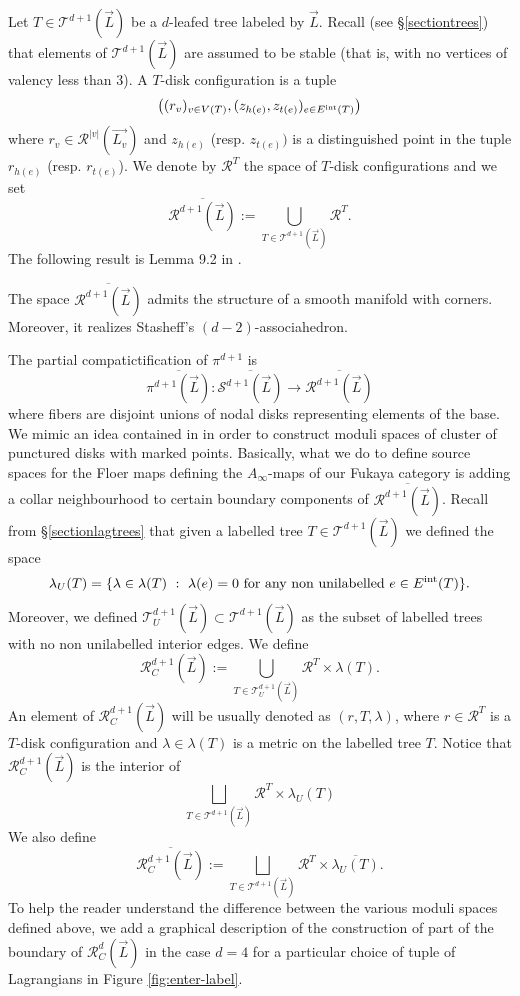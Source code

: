 Let $T\in \mathcal{T}^{d+1}(\vec{L})$ be a $d$-leafed tree labeled by $\vec{L}$. Recall (see \S \ref{sectiontrees}) that elements of $\mathcal{T}^{d+1}(\vec{L})$ are assumed to be stable (that is, with no vertices of valency less than $3$). A $T$-disk configuration is a tuple $$\left((r_v)_{v\in V(T)}, (z_{h(e)},z_{t(e)})_{e\in E^\textnormal{int}(T)}\right)$$ where $r_v\in \mathcal{R}^{|v|}(\vec{L_v})$ and $z_{h(e)}$ (resp. $z_{t(e)})$ is a distinguished point in the tuple $r_{h(e)}$ (resp. $r_{t(e)}$). We denote by $\mathcal{R}^T$ the space of $T$-disk configurations and we set $$\overline{\mathcal{R}^{d+1}(\vec{L})}:=\bigcup_{T\in \mathcal{T}^{d+1}(\vec{L})}\mathcal{R}^T.$$
The following result is Lemma 9.2 in \cite{Se:book-fukaya-categ}.
\begin{lemma}\label{disc2}
	The space $\overline{\mathcal{R}^{d+1}(\vec{L})}$ admits the structure of a smooth manifold with corners. Moreover, it realizes Stasheff's $(d-2)$-associahedron.
\end{lemma}
\noindent The partial compatictification of $\pi^{d+1}$ is  $$\overline{\pi^{d+1}(\vec{L})}: \overline{\mathcal{S}^{d+1}(\vec{L})}\to \overline{\mathcal{R}^{d+1}(\vec{L})}$$ where fibers are disjoint unions of nodal disks representing elements of the base.\\

We mimic an idea contained in \cite{Charest2012SourceComplexes} in order to construct moduli spaces of cluster of punctured disks with marked points. Basically, what we do to define source spaces for the Floer maps defining the $A_\infty$-maps of our Fukaya category is adding a collar neighbourhood to certain boundary components of $\overline{\mathcal{R}^{d+1}(\vec{L})}$. Recall from \S \ref{sectionlagtrees} that given a labelled tree $T\in \mathcal{T}^{d+1}(\vec{L})$ we defined the space $$\lambda_U(T)=\{\lambda\in \lambda(T) \ : \ \lambda(e)= 0 \textnormal{ for any non unilabelled }e\in E^\textnormal{int}(T)\}.$$ Moreover, we defined $\mathcal{T}^{d+1}_U(\vec{L})\subset \mathcal{T}^{d+1}(\vec{L})$ as the subset of labelled trees with no non unilabelled interior edges. We define $$\mathcal{R}^{d+1}_C(\vec{L}):=\bigcup_{T\in \mathcal{T}^{d+1}_U(\vec{L})}\mathcal{R}^T\times \lambda(T).$$ An element of $\mathcal{R}^{d+1}_C(\vec{L})$ will be usually denoted as $(r,T,\lambda)$, where $r\in \mathcal{R}^T$ is a $T$-disk configuration and $\lambda\in \lambda(T)$ is a metric on the labelled tree $T$. Notice that $\mathcal{R}^{d+1}_C(\vec{L})$ is the interior of $$\bigsqcup_{T\in \mathcal{T}^{d+1}(\vec{L})} \mathcal{R}^T\times \lambda_U(T)$$ We also define $$\overline{\mathcal{R}^{d+1}_C(\vec{L})}:= \bigsqcup_{T\in \mathcal{T}^{d+1}(\vec{L})} \mathcal{R}^T\times \overline{\lambda_U(T)}.$$
\noindent To help the reader understand the difference between the various moduli spaces defined above, we add a graphical description of the construction of part of the boundary of $\mathcal{R}^{d}_C(\vec{L})$ in the case $d=4$ for a particular choice of tuple of Lagrangians in Figure \ref{fig:enter-label}.


